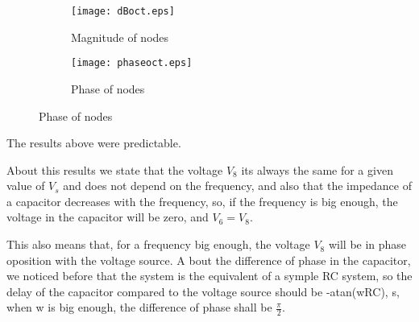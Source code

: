  \begin{figure}[H]
 \footnotesize
\begin{subfigure}{.49\linewidth}
 \footnotesize
  \centering
  \texttt{[image: dBoct.eps]}
   \footnotesize
\caption{Magnitude of nodes}
\label{fig:final_magnitude}
\end{subfigure}
\begin{subfigure}{.49\linewidth}
  \centering
  \texttt{[image: phaseoct.eps]}  
\caption{Phase of nodes}
\label{fig:final_phase}
\end{subfigure}
 \end{figure}
 The results above were predictable.
 \par
 About this results we state that the voltage $V_8$ its always the same for a given value of $V_s$ and does not depend on the frequency, and also that the impedance of a capacitor decreases with the frequency, so, if the frequency is big enough, the voltage in the capacitor will be zero, and $V_6=V_8$.
 \par
 This also means that, for a frequency big enough, the voltage $V_8$ will be in phase oposition with the voltage source. A bout the difference of phase in the capacitor, we noticed before that the system is the equivalent of a symple RC system, so the delay of the capacitor compared to the voltage source should be -atan(wRC), s, when w is big enough, the difference of phase shall be $\frac{\pi}{2}$.



